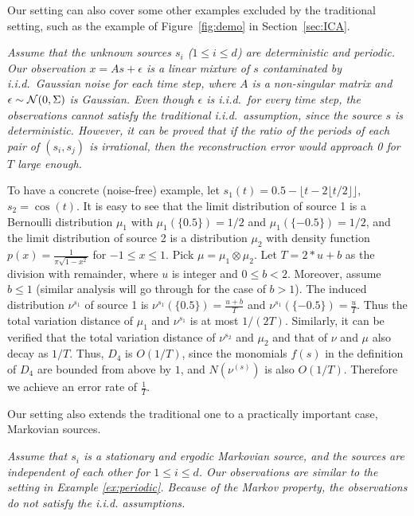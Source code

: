 \documentclass[11pt]{article}
\newcommand{\cN}{\cal{N}}
\newcommand{\eps}{\epsilon}
\begin{document}
Our setting can also cover some other examples excluded by the traditional setting, such as the example of Figure~\ref{fig:demo} in Section~\ref{sec:ICA}.
\begin{example} \em
	\label{ex:periodic}
	Assume that the unknown sources $s_i$ ($1\le i\le d$) are deterministic and periodic. Our observation $x=As+\eps$ is a linear mixture of $s$ contaminated by i.i.d.\ Gaussian noise for each time step, where $A$ is a non-singular matrix and $\eps\sim {\cN}(0,\Sigma)$ is Gaussian.   
	Even though $\eps$ is i.i.d.\ for every time step, the observations cannot satisfy the traditional i.i.d.\ assumption, since the source $s$ is deterministic. 
	However, it can be proved that if the ratio of the periods of each pair of $(s_i, s_j)$ is irrational, then the reconstruction error would approach 0 for $T$ large enough.   
\end{example}
\begin{remark}
	To have a concrete (noise-free) example, let $s_1(t)=0.5 - \lfloor t-2\lfloor t/2 \rfloor \rfloor$, $s_2=\cos(t)$. 
	It is easy to see that the limit distribution of source 1 is a Bernoulli distribution $\mu_1$ with $\mu_1(\{0.5\}) = 1/2$ and $\mu_1(\{-0.5\}) = 1/2$, and the limit distribution of source 2 is a distribution $\mu_2$ with density function $p(x) = \frac{1}{\pi \sqrt{1-x^2}}$ for $-1\le x \le 1$.
	Pick $\mu = \mu_1 \otimes \mu_2$.
	Let $T = 2*u + b$ as the division with remainder, where $u$ is integer and $0\le b<2$. 
	Moreover, assume $b\le 1$ (similar analysis will go through for the case of $b>1$).  
	The induced distribution $\nu^{s_1}$ of source 1 is $\nu^{s_1}(\{0.5\}) = \frac{u+b}{T}$ and $\nu^{s_1}(\{-0.5\}) = \frac{u}{T}$. 
	Thus the total variation distance of $\mu_1$ and $\nu^{s_1}$ is at most $1/(2T)$. 
	Similarly, it can be verified that the total variation distance of $\nu^{s_2}$ and $\mu_2$  and that of $\nu$ and $\mu$ also decay as $1/T$. 
	Thus, $D_4$ is $O(1/T)$, since the monomials $f(s)$ in the definition
	of $D_4$ are bounded from above by $1$, and $N(\nu^{(s)})$ is also $O(1/T)$.
	Therefore we achieve an error rate of $\frac{1}{T}$.
\end{remark}
Our setting also extends the traditional one to a practically important case, Markovian sources.  
\begin{example} \em
	\label{ex:markov}
	Assume that $s_i$ is a stationary and ergodic Markovian source, and the sources are independent of each other for $1\le i\le d$. Our observations are similar to the setting in Example \ref{ex:periodic}. 
	Because of the Markov property, the observations do not satisfy the i.i.d. assumptions.
\end{example}
\end{document}
